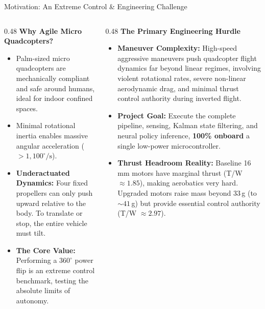 \documentclass[aspectratio=169,9pt]{beamer}
\begin{document}
\begin{frame}{Motivation: An Extreme Control \& Engineering Challenge}
  \begin{columns}[onlytextwidth,T]
    \begin{column}{0.48\textwidth}
      \textbf{Why Agile Micro Quadcopters?}
      \begin{itemize}\itemsep2pt
        \item Palm-sized micro quadcopters are mechanically compliant and safe around humans, ideal for indoor confined spaces.
        \item Minimal rotational inertia enables massive angular acceleration ($>1,100^\circ/\text{s}$).
        \item \textbf{Underactuated Dynamics:} Four fixed propellers can only push upward relative to the body. To translate or stop, the entire vehicle must tilt.
        \item \textbf{The Core Value:} Performing a $360^\circ$ power flip is an extreme control benchmark, testing the absolute limits of autonomy.
      \end{itemize}
    \end{column}
    
    \begin{column}{0.48\textwidth}
      \textbf{The Primary Engineering Hurdle}
      \begin{itemize}\itemsep2pt
        \item \textbf{Maneuver Complexity:} High-speed aggressive maneuvers push quadcopter flight dynamics far beyond linear regimes, involving violent rotational rates, severe non-linear aerodynamic drag, and minimal thrust control authority during inverted flight.
        \item \textbf{Project Goal:} Execute the complete pipeline, sensing, Kalman state filtering, and neural policy inference, \textbf{100\% onboard} a single low-power microcontroller.
        \item \textbf{Thrust Headroom Reality:} Baseline 16\,mm motors have marginal thrust (T/W $\approx 1.85$), making aerobatics very hard. Upgraded motors raise mass beyond 33\,g (to $\sim 41$\,g) but provide essential control authority (T/W $\approx 2.97$).
      \end{itemize}
    \end{column}
  \end{columns}
\end{frame}
\end{document}
